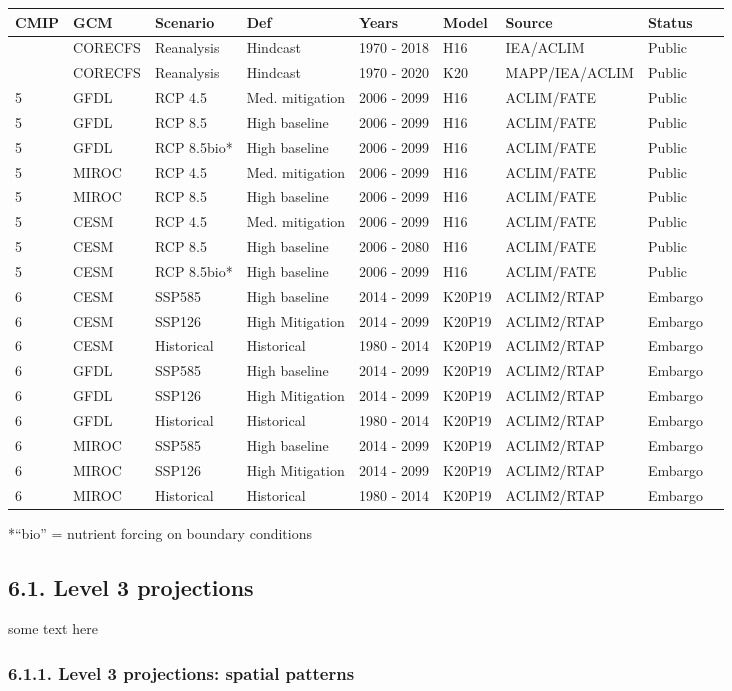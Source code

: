 \documentclass[
]{article}
\begin{document}
\begin{longtable}[]{@{}lllllllll@{}}
\toprule
CMIP & GCM & Scenario & Def & Years & Model & Source & Status
&\tabularnewline
\midrule
\endhead
& CORECFS & Reanalysis & Hindcast & 1970 - 2018 & H16 & IEA/ACLIM &
Public &\tabularnewline
& CORECFS & Reanalysis & Hindcast & 1970 - 2020 & K20 & MAPP/IEA/ACLIM &
Public &\tabularnewline
5 & GFDL & RCP 4.5 & Med. mitigation & 2006 - 2099 & H16 & ACLIM/FATE &
Public &\tabularnewline
5 & GFDL & RCP 8.5 & High baseline & 2006 - 2099 & H16 & ACLIM/FATE &
Public &\tabularnewline
5 & GFDL & RCP 8.5bio* & High baseline & 2006 - 2099 & H16 & ACLIM/FATE
& Public &\tabularnewline
5 & MIROC & RCP 4.5 & Med. mitigation & 2006 - 2099 & H16 & ACLIM/FATE &
Public &\tabularnewline
5 & MIROC & RCP 8.5 & High baseline & 2006 - 2099 & H16 & ACLIM/FATE &
Public &\tabularnewline
5 & CESM & RCP 4.5 & Med. mitigation & 2006 - 2099 & H16 & ACLIM/FATE &
Public &\tabularnewline
5 & CESM & RCP 8.5 & High baseline & 2006 - 2080 & H16 & ACLIM/FATE &
Public &\tabularnewline
5 & CESM & RCP 8.5bio* & High baseline & 2006 - 2099 & H16 & ACLIM/FATE
& Public &\tabularnewline
6 & CESM & SSP585 & High baseline & 2014 - 2099 & K20P19 & ACLIM2/RTAP &
Embargo &\tabularnewline
6 & CESM & SSP126 & High Mitigation & 2014 - 2099 & K20P19 & ACLIM2/RTAP
& Embargo &\tabularnewline
6 & CESM & Historical & Historical & 1980 - 2014 & K20P19 & ACLIM2/RTAP
& Embargo &\tabularnewline
6 & GFDL & SSP585 & High baseline & 2014 - 2099 & K20P19 & ACLIM2/RTAP &
Embargo &\tabularnewline
6 & GFDL & SSP126 & High Mitigation & 2014 - 2099 & K20P19 & ACLIM2/RTAP
& Embargo &\tabularnewline
6 & GFDL & Historical & Historical & 1980 - 2014 & K20P19 & ACLIM2/RTAP
& Embargo &\tabularnewline
6 & MIROC & SSP585 & High baseline & 2014 - 2099 & K20P19 & ACLIM2/RTAP
& Embargo &\tabularnewline
6 & MIROC & SSP126 & High Mitigation & 2014 - 2099 & K20P19 &
ACLIM2/RTAP & Embargo &\tabularnewline
6 & MIROC & Historical & Historical & 1980 - 2014 & K20P19 & ACLIM2/RTAP
& Embargo &\tabularnewline
\bottomrule
\end{longtable}

*``bio'' = nutrient forcing on boundary conditions

\hypertarget{level-3-projections}{%
\subsection{6.1. Level 3 projections}\label{level-3-projections}}

some text here

\hypertarget{level-3-projections-spatial-patterns}{%
\subsubsection{6.1.1. Level 3 projections: spatial
patterns}\label{level-3-projections-spatial-patterns}}
\end{document}
